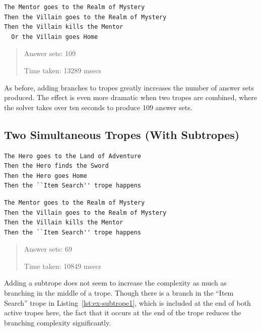 \documentclass[11pt]{report}
\begin{document}
\begin{lstlisting}[showstringspaces=false, label={lst:ex-simtrope2a},
caption={Second of two simultaneous tropes (with branches)}]
The Mentor goes to the Realm of Mystery
Then the Villain goes to the Realm of Mystery
Then the Villain kills the Mentor
  Or the Villain goes Home
\end{lstlisting}

\begin{quote}
Answer sets: 109

Time taken: 13289 msecs
\end{quote}

As before, adding branches to tropes greatly increases the number of answer sets
produced. The effect is even more dramatic when two tropes are combined, where the solver
takes over ten seconds to produce 109 answer sets.

\subsection{Two Simultaneous Tropes (With Subtropes)}

\begin{lstlisting}[showstringspaces=false, label={lst:ex-simtrope1b},
caption={First of two simultaneous tropes (with subtropes)}]
The Hero goes to the Land of Adventure
Then the Hero finds the Sword
Then the Hero goes Home
Then the ``Item Search'' trope happens
\end{lstlisting}

\begin{lstlisting}[showstringspaces=false, label={lst:ex-simtrope2b},
caption={Second of two simultaneous tropes (with subtropes)}]
The Mentor goes to the Realm of Mystery
Then the Villain goes to the Realm of Mystery
Then the Villain kills the Mentor
Then the ``Item Search'' trope happens
\end{lstlisting}

\begin{quote}
Answer sets: 69

Time taken: 10849 msecs
\end{quote}

Adding a subtrope does not seem to increase the complexity as much as branching
in the middle of a trope. Though there is a branch in the ``Item Search'' trope
in Listing~\ref{lst:ex-subtrope1}, which is included at the end of both active
tropes here, the fact that it occurs at the end of the trope reduces the
branching complexity significantly.
\end{document}
